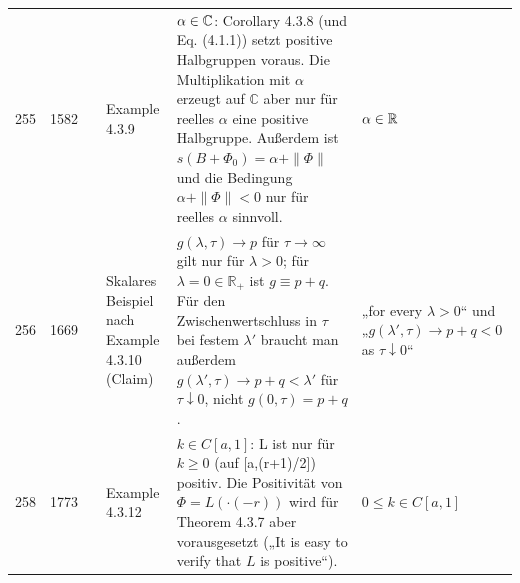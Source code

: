 \documentclass[10pt]{article}
\begin{document}
\begin{longtable}{@{}rrc>{\RaggedRight\arraybackslash}p{3.0cm}>{\RaggedRight\arraybackslash}p{11.4cm}>{\RaggedRight\arraybackslash}p{7.4cm}@{}}
255 & 1582 & \sichA{} & Example 4.3.9 & $\alpha \in \mathbb{C}$: Corollary 4.3.8 (und Eq. (4.1.1)) setzt positive Halbgruppen voraus. Die Multiplikation mit $\ensuremath{\alpha}$ erzeugt auf $\ensuremath{\mathbb{C}}$ aber nur für reelles $\ensuremath{\alpha}$ eine positive Halbgruppe. Außerdem ist $s(B + \Phi_{0}) = \alpha + \|\Phi\|$ und die Bedingung $\alpha + \|\Phi\| < 0$ nur für reelles $\ensuremath{\alpha}$ sinnvoll. & $\alpha \in \mathbb{R}$ \\[2pt]
256 & 1669 & \sichB{} & Skalares Beispiel nach Example 4.3.10 (Claim) & $g(\lambda,\tau) \to p$ für $\ensuremath{\tau} \ensuremath{\to} \ensuremath{\infty}$ gilt nur für $\ensuremath{\lambda} > 0$; für $\ensuremath{\lambda} = 0 \ensuremath{\in} \ensuremath{\mathbb{R}}_+$ ist $g \ensuremath{\equiv} p + q$. Für den Zwischenwertschluss in $\ensuremath{\tau}$ bei festem $\ensuremath{\lambda}\ensuremath{{}'}$ braucht man außerdem $g(\ensuremath{\lambda}\ensuremath{{}'},\ensuremath{\tau}) \ensuremath{\to} p + q < \ensuremath{\lambda}\ensuremath{{}'}$ für $\ensuremath{\tau} \ensuremath{\downarrow} 0$, nicht $g(0,\ensuremath{\tau}) = p + q$. & „for every $\lambda > 0$“ und „$g(\lambda',\tau) \to p+q < 0$ as $\tau \downarrow 0$“ \\[2pt]
258 & 1773 & \sichA{} & Example 4.3.12 & $k \in C[a,1]$: L ist nur für $k \ensuremath{\geq} 0$ (auf [a,(r+1)/2]) positiv. Die Positivität von $\ensuremath{\Phi} = L(\ensuremath{\cdot}(\ensuremath{-}r))$ wird für Theorem 4.3.7 aber vorausgesetzt („It is easy to verify that $L$ is positive“). & $0 \leq k \in C[a,1]$ \\
\end{longtable}
\end{document}
